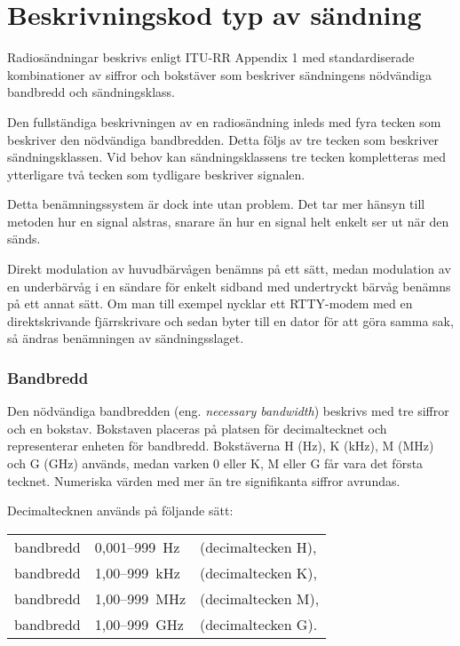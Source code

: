 \chapter{Beskrivningskod typ av sändning}
\label{sändslag}

Radiosändningar beskrivs enligt ITU-RR Appendix 1 \cite{ITU-RR-appendices} med
standardiserade kombinationer av siffror och bokstäver som beskriver
sändningens nödvändiga bandbredd och sändningsklass.

Den fullständiga beskrivningen av en radiosändning inleds med fyra tecken
som beskriver den nödvändiga bandbredden.
Detta följs av tre tecken som beskriver sändningsklassen.
Vid behov kan sändningsklassens tre tecken kompletteras med ytterligare två
tecken som tydligare beskriver signalen.

Detta benämningssystem är dock inte utan problem.
Det tar mer hänsyn till metoden hur en signal alstras, snarare än hur en signal
helt enkelt ser ut när den sänds.

Direkt modulation av huvudbärvågen benämns på ett sätt, medan modulation
av en underbärvåg i en sändare för enkelt sidband med undertryckt bärvåg
benämns på ett annat sätt.
Om man till exempel nycklar ett RTTY-modem med en direktskrivande fjärrskrivare och
sedan byter till en dator för att göra samma sak, så ändras benämningen av
sändningsslaget.

\subsection{Bandbredd}

Den nödvändiga bandbredden (eng. \emph{necessary bandwidth}) beskrivs med
tre siffror och en bokstav.
Bokstaven placeras på platsen för decimaltecknet och representerar enheten för
bandbredd.
Bokstäverna H (Hz), K (kHz), M (MHz) och G (GHz) används, medan varken 0 eller
K, M eller G får vara det första tecknet.
Numeriska värden med mer än tre signifikanta siffror avrundas.

Decimaltecknen används på följande sätt:\\
\begin{tabular}{lll}
	bandbredd & 0,001--999~Hz & (decimaltecken H),\\
	bandbredd & 1,00--999~kHz & (decimaltecken K),\\
	bandbredd & 1,00--999~MHz & (decimaltecken M),\\
	bandbredd & 1,00--999~GHz & (decimaltecken G).\\
\end{tabular}

